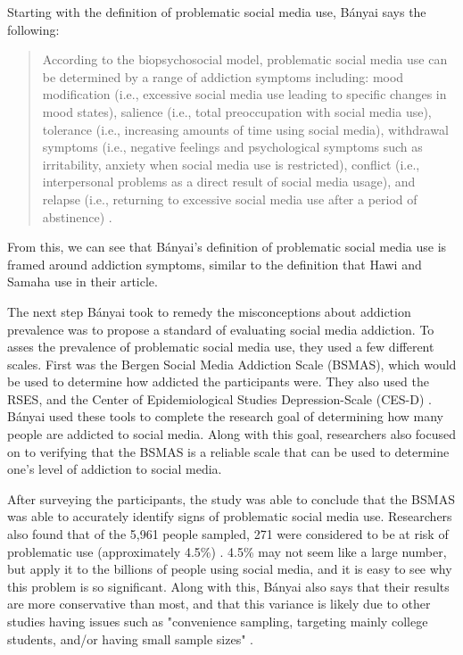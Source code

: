 \documentclass[12pt, journal, compsoc]{IEEEtran}
\begin{document}
Starting with the definition of problematic social media use, B\'anyai says the following:
\begin{quote}
According to the biopsychosocial model, problematic social media use can be determined by a range of addiction symptoms including: mood modification (i.e., excessive social media use leading to specific changes in mood states), salience (i.e., total preoccupation with social media use), tolerance (i.e., increasing amounts of time using social media), withdrawal symptoms (i.e., negative feelings and psychological symptoms such as irritability, anxiety when social media use is restricted), conflict (i.e., interpersonal problems as a direct result of social media usage), and relapse (i.e., returning to excessive social media use after a period of abstinence) \cite{ProblematicUse}.
\end{quote}

From this, we can see that B\'anyai's definition of problematic social media use is framed around addiction symptoms, similar to the definition that Hawi and Samaha use in their article. 

The next step B\'anyai took to remedy the misconceptions about addiction prevalence was to propose a standard of evaluating social media addiction. To asses the prevalence of problematic social media use, they used a few different scales. First was the Bergen Social Media Addiction Scale (BSMAS), which would be used to determine how addicted the participants were. They also used the RSES, and the Center of Epidemiological Studies Depression-Scale (CES-D) \cite{ProblematicUse}. B\'anyai used these tools to complete the research goal of determining how many people are addicted to social media. Along with this goal, researchers also focused on to verifying that the BSMAS is a reliable scale that can be used to determine one's level of addiction to social media. 

After surveying the participants, the study was able to conclude that the BSMAS was able to accurately identify signs of problematic social media use. Researchers also found that of the 5,961 people sampled, 271 were considered to be at risk of problematic use (approximately 4.5\%) \cite{ProblematicUse}. 4.5\% may not seem like a large number, but apply it to the billions of people using social media, and it is easy to see why this problem is so significant. Along with this, B\'anyai also says that their results are more conservative than most, and that this variance is likely due to other studies having issues such as "convenience sampling, targeting mainly college students, and/or having small sample sizes" \cite{ProblematicUse}.
\end{document}
